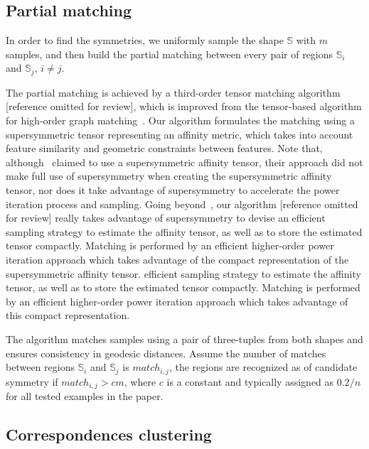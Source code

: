 \subsection{Partial matching}
\label{subsec:matching}

In order to find the symmetries, we uniformly sample the shape $\mathbb{S}$ with $m$ samples, 
and then build the partial matching between every pair of regions $\mathbb{S}_i$ and $\mathbb{S}_j$, $i \neq j$. 

The partial matching is achieved by a third-order tensor matching algorithm [reference omitted for review],
which is improved from the tensor-based algorithm for high-order graph matching~\cite{Duchenne2011}.
Our algorithm formulates the matching using a supersymmetric tensor representing an affinity metric,
which takes into account feature similarity and geometric constraints between features.
Note that, although~\cite{Duchenne2011} claimed to use a supersymmetric affinity tensor, 
their approach did not make full use of supersymmetry when creating the supersymmetric affinity tensor, nor does it take advantage of supersymmetry
to accelerate the power iteration process and sampling.
Going beyond~\cite{Duchenne2011}, our algorithm [reference omitted for review] really takes advantage of supersymmetry to devise an
efficient sampling strategy to estimate the affinity tensor, as well as to store the estimated tensor compactly.
Matching is performed by an efficient higher-order power iteration approach which takes advantage of the compact representation of the supersymmetric affinity tensor.
efficient sampling strategy to estimate the affinity tensor, as well as to store the estimated tensor compactly.
Matching is performed by an efficient higher-order power iteration approach which takes advantage of this compact representation.

The algorithm matches samples using a pair of three-tuples from both shapes and ensures consistency in geodesic distances. 
Assume the number of matches between regions $\mathbb{S}_i$ and $\mathbb{S}_j$ is $match_{i,j}$, 
the regions are recognized as of candidate symmetry if $match_{i,j} > cm$, where $c$ is a constant and typically assigned as $0.2/n$ for all tested examples in the paper.

\subsection{Correspondences clustering}

